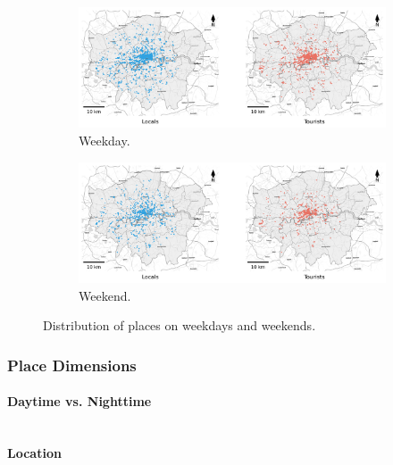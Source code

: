 \documentclass{article}
\newcommand{\subsubsubsection}[1]{\paragraph{#1}\mbox{}\\}
\theoremstyle{remark}
\begin{document}
\begin{figure}[!h]

\centering
\begin{subfigure}{0.6\textheight}
\centering
\includegraphics[width=0.9\linewidth]{figures/places_weekday.png}
\caption{Weekday.}
\label{fig:places_weekday}
\end{subfigure}
\begin{subfigure}{0.6\textheight}
\centering
\includegraphics[width=0.9\linewidth]{figures/places_weekend.png}
\caption{Weekend.}
\label{fig:places_weekend}
\end{subfigure}

\caption{Distribution of places on weekdays and weekends.}
\label{fig:places_distribution_week}
\end{figure}



\subsubsection{Place Dimensions}

\subsubsubsection{Daytime vs. Nighttime}

\textbf{Location}
\end{document}
